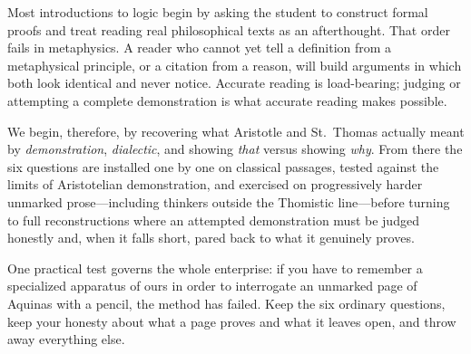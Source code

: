 Most introductions to logic begin by asking the student to construct formal proofs and treat reading real philosophical texts as an afterthought. That order fails in metaphysics. A reader who cannot yet tell a definition from a metaphysical principle, or a citation from a reason, will build arguments in which both look identical and never notice. Accurate reading is load-bearing; judging or attempting a complete demonstration is what accurate reading makes possible.

We begin, therefore, by recovering what Aristotle and St.\ Thomas actually meant by \emph{demonstration}, \emph{dialectic}, and showing \emph{that} versus showing \emph{why}. From there the six questions are installed one by one on classical passages, tested against the limits of Aristotelian demonstration, and exercised on progressively harder unmarked prose---including thinkers outside the Thomistic line---before turning to full reconstructions where an attempted demonstration must be judged honestly and, when it falls short, pared back to what it genuinely proves.

One practical test governs the whole enterprise: if you have to remember a specialized apparatus of ours in order to interrogate an unmarked page of Aquinas with a pencil, the method has failed. Keep the six ordinary questions, keep your honesty about what a page proves and what it leaves open, and throw away everything else.
